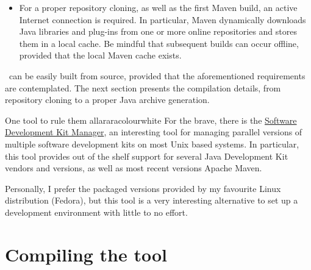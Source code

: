 \begin{itemize}[label={}]

Please refer to \href{https://maven.apache.org/}{project website} in order to obtain specific installation instructions for your operating system. In general, most recent Linux distributions have the Maven binary, as well the proper associated dependencies, available in their corresponding repositories.

\item For a proper repository cloning, as well as the first Maven build, an active Internet connection is required. In particular, Maven dynamically downloads Java libraries and plug-ins from one or more online repositories and stores them in a local cache. Be mindful that subsequent builds can occur offline, provided that the local Maven cache exists.
\end{itemize}

\arara\ can be easily built from source, provided that the aforementioned requirements are contemplated. The next section presents the compilation details, from repository cloning to a proper Java archive generation.

\begin{messagebox}{One tool to rule them all}{araracolour}{\icok}{white}
\setlength{\parskip}{1em}
For the brave, there is the \href{https://sdkman.io/}{Software Development Kit Manager}, an interesting tool for managing parallel versions of multiple software development kits on most Unix based systems. In particular, this tool provides out of the shelf support for several Java Development Kit vendors and versions, as well as most recent versions Apache Maven.

Personally, I prefer the packaged versions provided by my favourite Linux distribution (Fedora), but this tool is a very interesting alternative to set up a development environment with little to no effort.
\end{messagebox}

\section{Compiling the tool}
\label{sec:compilingthetool}

